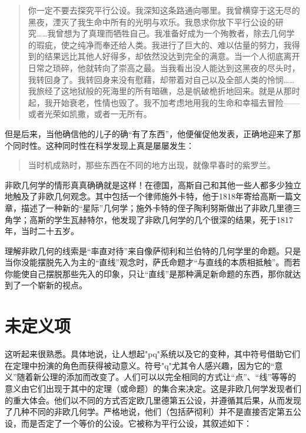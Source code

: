\begin{quote}
你一定不要去探究平行公设。我深知这条路通向哪里。我曾横穿于这无尽的黑夜，湮灭了我生命中所有的光明与欢乐。我恳求你放下平行公设的研究……我曾想为了真理而牺牲自己。我准备好成为一个殉教者，除去几何学的瑕疵，使之纯净而奉还给人类。我进行了巨大的、难以估量的努力，我得到的结果远比其他人好得多，却依然没达到完全的满意。当一个人彻底离开日常之琐碎，他就转向了崇高之最。当我看出没人能达到这黑夜的尽头时，我转回身了。我转回身来没有慰藉，却带着对自己以及全部人类的怜悯……我旅经了这地狱般的死海里的所有暗礁，总是帆破桅折地回来。就是从那时起，我开始衰老，性情也毁了。我不加考虑地用我的生命和幸福去冒险——或者光荣如凯撒，或者一无所有。
\end{quote}

但是后来，当他确信他的儿子的确“有了东西”，他便催促他发表，正确地迎来了那个同时性。这种同时性在科学发现上真是屡屡发生：

\begin{quote}
当时机成熟时，那些东西在不同的地方出现，就像早春时的紫罗兰。
\end{quote}

非欧几何学的情形真真确确就是这样！在德国，高斯自己和其他一些人都多少独立地触及了非欧几何观念。其中包括一个律师施外卡特，他于1818年寄给高斯一篇文章，描述了一种新的“星际”几何学；施外卡特的侄子陶利努斯做出了非欧几里德三角学；高斯的学生瓦赫特尔，他发现了非欧几何学的几个很深的结果，死于1817年，当时二十五岁。

理解非欧几何的线索是“率直对待”来自像萨彻利和兰伯特的几何学里的命题。只是当你没能摆脱先入为主的“直线”观念时，萨氏命题才“与直线的本质相抵触”。而若你能使自己摆脱那些先入的印象，只让“直线”是那种满足新命题的东西，那你就达到了一个崭新的视点。

\section{未定义项}

这听起来很熟悉。具体地说，让人想起"pq"系统以及它的变种，其中符号借助它们在定理中扮演的角色而获得被动意义。符号"q"尤其令人感兴趣，因为它的“意义”随着新公理的添加而改变了。人们可以以完全相同的方式让“点”、“线”等等的意义由它们出现于其中的定理（或命题）的集合来决定。这是非欧几何学发现者们的重大体会。他们以不同的方式否定欧几里德第五公设，并遵循其后果，从而发现了几种不同的非欧几何学。严格地说，他们（包括萨彻利）并不是直接否定第五公设，而是否定了一个等价的公设。它被称为平行公设，其叙述如下：

